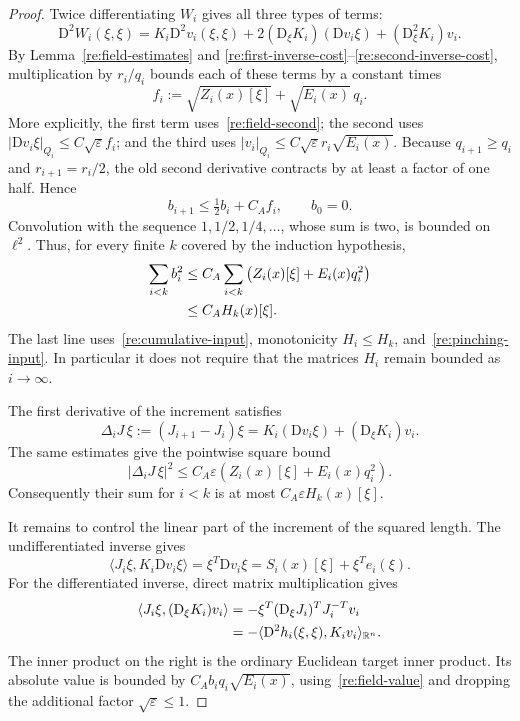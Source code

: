 \begin{proof}
Twice differentiating $W_i$ gives all three types of terms:
\begin{equation}
 \label{re:second-increment-terms}
 \mathrm D^2W_i(\xi,\xi)
   =K_i\mathrm D^2v_i(\xi,\xi)
     +2(\mathrm D_\xi K_i)(\mathrm Dv_i\xi)
     +(\mathrm D_\xi^2 K_i)v_i.
\end{equation}
By Lemma~\ref{re:field-estimates} and
\eqref{re:first-inverse-cost}--\eqref{re:second-inverse-cost},
multiplication by $r_i/q_i$ bounds each of these terms by a constant
times
\[
 f_i:=\sqrt{Z_i(x)[\xi]}+\sqrt{E_i(x)}\,q_i.
\]
More explicitly, the first term uses~\eqref{re:field-second}; the
second uses $|\mathrm Dv_i\xi|_{Q_i}\le
C\sqrt\varepsilon f_i$; and the third uses
$|v_i|_{Q_i}\le C\sqrt\varepsilon r_i\sqrt{E_i(x)}$.
Because $q_{i+1}\ge q_i$ and $r_{i+1}=r_i/2$, the old second
derivative contracts by at least a factor of one half.  Hence
\begin{equation}
 \label{re:diagonal-recurrence}
 b_{i+1}\le\tfrac12 b_i+C_A f_i,
 \qquad b_0=0.
\end{equation}
Convolution with the sequence $1,1/2,1/4,\ldots$, whose sum is two,
is bounded on $\ell^2$.  Thus, for every finite $k$ covered by the
induction hypothesis,
\begin{align}
 \sum_{i<k}b_i^2
 &\le C_A\sum_{i<k}\left(Z_i(x)[\xi]+E_i(x)q_i^2\right)
       \notag\\
 &\le C_A H_k(x)[\xi].
       \label{re:diagonal-square-sum}
\end{align}
The last line uses~\eqref{re:cumulative-input}, monotonicity
$H_i\le H_k$, and~\eqref{re:pinching-input}.  In particular it
does not require that the matrices $H_i$ remain bounded as
$i\to\infty$.

The first derivative of the increment satisfies
\[
 \Delta_iJ\,\xi:=(J_{i+1}-J_i)\xi
       =K_i(\mathrm Dv_i\xi)+(\mathrm D_\xi K_i)v_i.
\]
The same estimates give the pointwise square bound
\begin{equation}
 \label{re:squared-increment}
 |\Delta_iJ\,\xi|^2
 \le C_A\varepsilon
           \left(Z_i(x)[\xi]+E_i(x)q_i^2\right).
\end{equation}
Consequently their sum for $i<k$ is at most
$C_A\varepsilon H_k(x)[\xi]$.

It remains to control the linear part of the increment of the squared
length.  The undifferentiated inverse gives
\[
 \langle J_i\xi,K_i\mathrm Dv_i\xi\rangle
       =\xi^T\mathrm Dv_i\xi
       =S_i(x)[\xi]+\xi^Te_i(\xi).
\]
For the differentiated inverse, direct matrix multiplication gives
\begin{align}
 \langle J_i\xi,(\mathrm D_\xi K_i)v_i\rangle
 &=-\xi^T(\mathrm D_\xi J_i)^TJ_i^{-T}v_i
       \notag\\
 &=-\langle\mathrm D^2h_i(\xi,\xi),K_iv_i\rangle_{\mathbb R^n}.
       \label{re:inverse-transpose-contraction}
\end{align}
The inner product on the right is the ordinary Euclidean target
inner product.  Its absolute value is bounded by
$C_A b_iq_i\sqrt{E_i(x)}$, using~\eqref{re:field-value} and
dropping the additional factor $\sqrt\varepsilon\le1$.


\end{proof}
